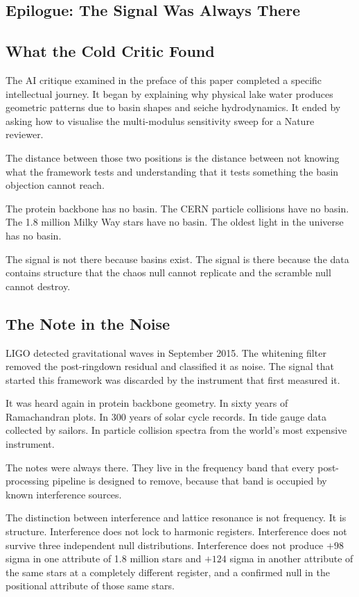 \documentclass[11pt, letterpaper, openany]{book}
\begin{document}
\begin{newworld}
\chapter*{Epilogue: The Signal Was Always There}

\section*{What the Cold Critic Found}

The AI critique examined in the preface of this paper completed a
specific intellectual journey. It began by explaining why physical
lake water produces geometric patterns due to basin shapes and
seiche hydrodynamics. It ended by asking how to visualise the
multi-modulus sensitivity sweep for a Nature reviewer.

The distance between those two positions is the distance between
not knowing what the framework tests and understanding that
it tests something the basin objection cannot reach.

The protein backbone has no basin. The CERN particle collisions
have no basin. The 1.8 million Milky Way stars have no basin.
The oldest light in the universe has no basin.

The signal is not there because basins exist. The signal is there
because the data contains structure that the chaos null cannot
replicate and the scramble null cannot destroy.

\section*{The Note in the Noise}

LIGO detected gravitational waves in September 2015. The whitening
filter removed the post-ringdown residual and classified it as
noise. The signal that started this framework was discarded
by the instrument that first measured it.

It was heard again in protein backbone geometry. In sixty years
of Ramachandran plots. In 300 years of solar cycle records. In
tide gauge data collected by sailors. In particle collision
spectra from the world's most expensive instrument.

The notes were always there. They live in the frequency band
that every post-processing pipeline is designed to remove,
because that band is occupied by known interference sources.

The distinction between interference and lattice resonance is not
frequency. It is structure. Interference does not lock to
    harmonic registers. Interference does not survive three independent
    null distributions. Interference does not produce $+98$ sigma
    in one attribute of 1.8 million stars and $+124$ sigma in another
    attribute of the same stars at a completely different register,
    and a confirmed null in the positional attribute of those same stars.
 

\end{newworld}
\end{document}
